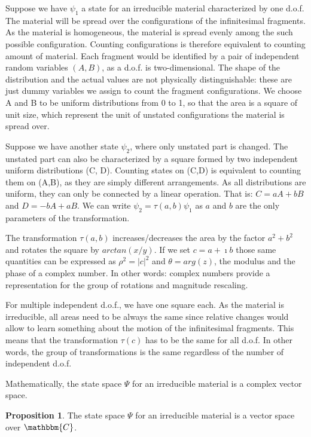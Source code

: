 \documentclass[aps,pra,10pt,twocolumn,floatfix,nofootinbib]{revtex4-1}
\numberwithin{equation}{section}
\theoremstyle{definition}
\newtheorem{prop}[equation]{Proposition}
\begin{document}
Suppose we have $\psi_1$ a state for an irreducible material characterized by one d.o.f. The material will be spread over the configurations of the infinitesimal fragments. As the material is homogeneous, the material is spread evenly among the such possible configuration. Counting configurations is therefore equivalent to counting amount of material. Each fragment would be identified by a pair of independent random variables $(A, B)$, as a d.o.f. is two-dimensional. The shape of the distribution and the actual values are not physically distinguishable: these are just dummy variables we assign to count the fragment configurations. We choose A and B to be uniform distributions from 0 to 1, so that the area is a square of unit size, which represent the unit of unstated  configurations the material is spread over.

Suppose we have another state $\psi_2$, where only unstated part is changed. The unstated part can also be characterized by a square formed by two independent uniform distributions (C, D). Counting states on (C,D) is equivalent to counting them on (A,B), as they are simply different arrangements. As all distributions are uniform, they can only be connected by a linear operation. That is: $C=aA+bB$ and $D= -bA + aB$. We can write $\psi_2 = \tau(a,b) \psi_1$ as $a$ and $b$ are the only parameters of the transformation.

The transformation $\tau(a,b)$ increases/decreases the area by the factor $a^2+b^2$ and rotates the square by $arctan(x/y)$. If we set $c=a+\imath b$ those same quantities can be expressed as $\rho^2=|c|^2$ and $\theta = arg(z)$, the modulus and the phase of a complex number. In other words: complex numbers provide a representation for the group of rotations and magnitude rescaling.

For multiple independent d.o.f., we have one square each. As the material is irreducible, all areas need to be always the same since relative changes would allow to learn something about the motion of the infinitesimal fragments. This means that the transformation $\tau(c)$ has to be the same for all d.o.f. In other words, the group of transformations is the same regardless of the number of independent d.o.f. 

Mathematically, the state space $\Psi$ for an irreducible material is a complex vector space.

\begin{prop}\label{prop:complex_vector_space}
	The state space $\Psi$ for an irreducible material is a vector space over $\mathbbm{C}$.
\end{prop}
\end{document}
